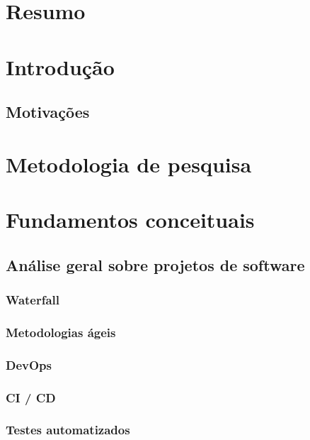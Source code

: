 \documentclass[]{../class/politex}
\begin{document}
  \capa

  \sumario

  \chapter{Resumo}

  \chapter{Introdução}

    \section{Motivações}

  \chapter{Metodologia de pesquisa}

  

  \chapter{Fundamentos conceituais}

    \section{Análise geral sobre projetos de software}

      \subsection{Waterfall}

      \subsection{Metodologias ágeis}

      \subsection{DevOps}

      \subsection{CI / CD}

      \subsection{Testes automatizados}
\end{document}
